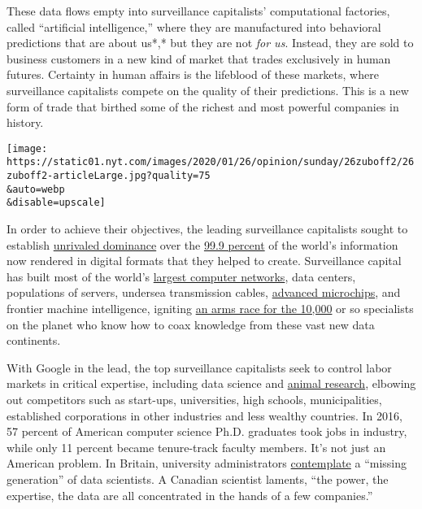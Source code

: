 These data flows empty into surveillance capitalists' computational
factories, called ``artificial intelligence,'' where they are
manufactured into behavioral predictions that are about us*,* but they
are not \emph{for us}. Instead, they are sold to business customers in a
new kind of market that trades exclusively in human futures. Certainty
in human affairs is the lifeblood of these markets, where surveillance
capitalists compete on the quality of their predictions. This is a new
form of trade that birthed some of the richest and most powerful
companies in history.

\texttt{[image: https://static01.nyt.com/images/2020/01/26/opinion/sunday/26zuboff2/26zuboff2-articleLarge.jpg?quality=75\\\&auto=webp\\\&disable=upscale]}

In order to achieve their objectives, the leading surveillance
capitalists sought to establish
\href{http://www.martinhilbert.net/Hilbert_Significance_pre-publish.pdf}{unrivaled
dominance} over the
\href{https://papers.ssrn.com/sol3/papers.cfm?abstract_id=2205145}{99.9
percent} of the world's information now rendered in digital formats that
they helped to create. Surveillance capital has built most of the
world's
\href{https://data-economy.com/hyperscalers-taking-world-unprecedented-scale/}{largest
computer networks}, data centers, populations of servers, undersea
transmission cables,
\href{https://www.wired.com/2017/04/building-ai-chip-saved-google-building-dozen-new-data-centers/}{advanced
microchips}, and frontier machine intelligence, igniting
\href{https://www.nytimes.com/2017/10/22/technology/artificial-intelligence-experts-salaries.html}{an
arms race for the 10,000} or so specialists on the planet who know how
to coax knowledge from these vast new data continents.

With Google in the lead, the top surveillance capitalists seek to
control labor markets in critical expertise, including data science and
\href{https://www.bloomberg.com/news/features/2019-06-18/apple-google-and-facebook-are-raiding-animal-research-labs}{animal
research}, elbowing out competitors such as start-ups, universities,
high schools, municipalities, established corporations in other
industries and less wealthy countries. In 2016, 57 percent of American
computer science Ph.D. graduates took jobs in industry, while only 11
percent became tenure-track faculty members. It's not just an American
problem. In Britain, university administrators
\href{https://www.theguardian.com/science/2017/nov/02/big-tech-firms-google-ai-hiring-frenzy-brain-drain-uk-universities}{contemplate}
a ``missing generation'' of data scientists. A Canadian scientist
laments, ``the power, the expertise, the data are all concentrated in
the hands of a few companies.''


